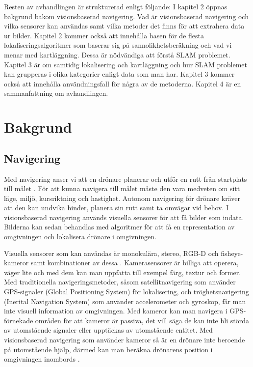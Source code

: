 Resten av avhandlingen är strukturerad enligt följande: I kapitel 2 öppnas bakgrund bakom visionsbaserad navigering. Vad är visionsbaserad navigering och vilka sensorer kan användas samt vilka metoder det finns för att extrahera data ur bilder. Kapitel 2 kommer också att innehålla basen för de flesta lokaliseringsalgoritmer som baserar sig på sannolikhetsberäkning och vad vi menar med kartläggning. Dessa är nödvändiga att förstå SLAM problemet. Kapitel 3 är om samtidig lokalisering och kartläggning och hur SLAM problemet kan grupperas i olika kategorier enligt data som man har. Kapitel 3 kommer också att innehålla användningsfall för några av de metoderna. Kapitel 4 är en sammanfattning om avhandlingen.

\chapter{Bakgrund}

\section{Navigering}

Med navigering anser vi att en drönare planerar och utför en rutt från startplats till målet \citep{geospatial}. För att kunna navigera till målet måste den vara medveten om sitt läge, miljö, kursriktning och hastighet. Autonom navigering för drönare kräver att den kan undvika hinder, planera sin rutt samt ta omvägar vid behov. I visionsbaserad navigering används visuella sensorer för att få bilder som indata. Bilderna kan sedan behandlas med algoritmer för att få en representation av omgivningen och lokalisera drönare i omgivningen. 

Visuella sensorer som kan användas är monokulära, stereo, RGB-D och fisheye-kameror samt kombinationer av dessa \citep{geospatial}. Kamerasensorer är billiga att operera, väger lite och med dem kan man uppfatta till exempel färg, textur och former. Med traditionella navigeringsmetoder, såsom satellitnavigering som använder GPS-signaler (Global Positioning System) för lokalisering, och tröghetsnavigering (Inerital Navigation System) som använder accelerometer och gyroskop, får man inte visuell information av omgivningen. Med kameror kan man navigera i GPS-förnekade områden för att kameror är passiva, det vill säga de kan inte bli störda av utomstående signaler eller upptäckas av utomstående entitet. Med visionsbaserad navigering som använder kameror så är en drönare inte beroende på utomstående hjälp, därmed kan man beräkna drönarens position i omgivningen inombords \citep{opticalflowuav}.

